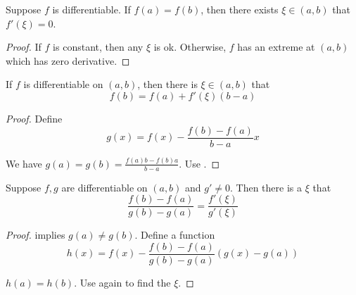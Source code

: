 \begin{theorem}\label{rolle_theorem}
    Suppose $f$ is differentiable. If $f(a) = f(b)$, then there exists $\xi \in (a,b)$ that $f'(\xi) = 0$.
\end{theorem}
\begin{proof}
    If $f$ is constant, then any $\xi$ is ok. Otherwise, $f$ has an extreme at $(a,b)$ which has zero derivative.
\end{proof}

\begin{theorem}
    If $f$ is differentiable on $(a,b)$, then there is $\xi \in (a,b)$ that
    \begin{equation}
        f(b) = f(a) + f'(\xi)(b-a)
    \end{equation}
\end{theorem}
\begin{proof}
    Define 
    \begin{equation}
        g(x) = f(x) - \frac{f(b) - f(a)}{b-a}x
    \end{equation}
    
    We have $g(a) = g(b) = \frac{f(a)b - f(b) a}{b-a}$. Use .
\end{proof}


\begin{theorem}
    Suppose $f,g$ are differentiable on $(a,b)$ and $g' \neq 0$. Then there is a $\xi$ that
    \begin{equation}
        \frac{f(b) - f(a)}{g(b) - g(a)} = \frac{f'(\xi)}{g'(\xi)}
    \end{equation}
\end{theorem}
\begin{proof}
     implies $g(a) \neq g(b)$. Define a function 
    \begin{equation}
        h(x) = f(x) - \frac{f(b) - f(a)}{g(b) - g(a)}(g(x) - g(a))
    \end{equation}
    
    $h(a) = h(b)$. Use  again to find the $\xi$.
\end{proof}

